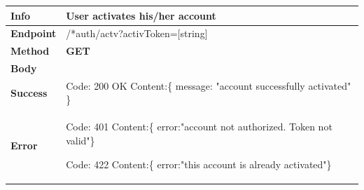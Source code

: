 \begin{table}[H]
\begin{tabular}{|l|p{}|}
\hline
\textbf{Info}             & User activates his/her account                                                                         \\ \hline
\textbf{Endpoint}    & /*auth/actv?activToken=[string] \\ \hline
\textbf{Method}         &   \textbf{GET}                                                                            \\ \hline

\textbf{Body}  &   \\ \hline
                    
\textbf{Success} &  Code: 200 OK \newline
                    Content:\{\newline 
                    message: "account successfully activated"\newline 
                    \}\\ \hline
\textbf{Error} &  Code: 401 \newline
                  Content:\{\newline
                  error:"account not authorized. Token not valid"\newline\}\newline
                  
                  Code: 422 \newline
                  Content:\{\newline
                  error:"this account is already activated"\newline\}\\\hline

\end{tabular}
\end{table}






